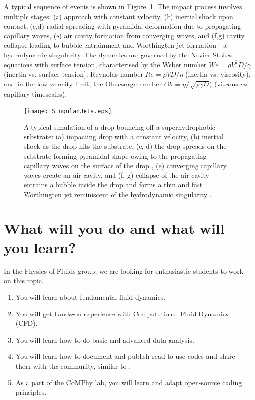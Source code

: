 \documentclass[11pt]{article}
\begin{document}
A typical sequence of events is shown in Figure~\ref{Figure::Typical}. The impact process involves multiple stages: (a) approach with constant velocity, (b) inertial shock upon contact, (c,d) radial spreading with pyramidal deformation due to propagating capillary waves, (e) air cavity formation from converging waves, and (f,g) cavity collapse leading to bubble entrainment and Worthington jet formation—a hydrodynamic singularity. The dynamics are governed by the Navier-Stokes equations with surface tension, characterised by the Weber number $We = \rho V^2D/\gamma$ (inertia vs. surface tension), Reynolds number $Re = \rho VD/\eta$ (inertia vs. viscosity), and in the low-velocity limit, the Ohnesorge number $Oh = \eta/\sqrt{\rho\gamma D}$) (viscous vs. capillary timescales).

\begin{figure}[H]
\begin{center}
 \texttt{[image: SingularJets.eps]}
 \caption{A typical simulation of a drop bouncing off a superhydrophobic substrate: (a) impacting drop with a constant velocity, (b) inertial shock as the drop hits the substrate, (c, d) the drop spreads on the substrate forming pyramidal shape owing to the propagating capillary waves on the surface of the drop \citep{renardy2003pyramidal, zhang2022impact}, (e) converging capillary waves create an air cavity, and (f, g) collapse of the air cavity entrains a bubble inside the drop and forms a thin and fast Worthington jet reminiscent of the hydrodynamic singularity \citep{Bartolo2006Singular}.}
 \label{Figure::Typical}
\end{center}

\end{figure}
\section*{What will you do and what will you learn?}
In the Physics of Fluids group, we are looking for enthusiastic students to work on this topic.
\begin{enumerate}
\itemsep0em
\item You will learn about fundamental fluid dynamics.
\item You will get hands-on experience with Computational Fluid Dynamics (CFD).
\item You will learn how to do basic and advanced data analysis.
\item You will learn how to document and publish read-to-use codes and share them with the community, similar to \citet{basiliskVatsal, basiliskVatsalDropFilm, basiliskVatsalViscousBouncing}. 
\item As a part of the \href{https://comphy-lab.org}{CoMPhy lab}, you will learn and adapt open-source coding principles. 
\end{enumerate}
\end{document}
